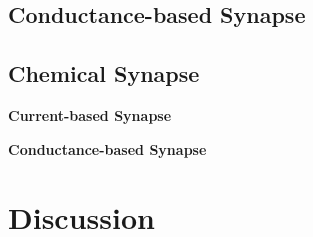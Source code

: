
\subsection{Conductance-based Synapse}

\subsection{Chemical Synapse}

 \textbf{Current-based Synapse}


\textbf{Conductance-based Synapse}


\section{Discussion}


